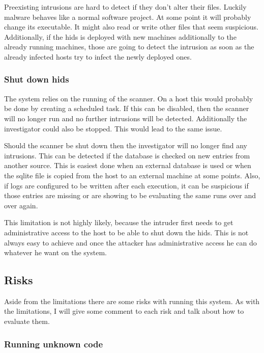 \documentclass[
	a4paper,					%
	10pt,							%
	twoside,					%
	openright,				%
	notitlepage,			%
	parskip=half,			%
]{scrreprt}					%
\begin{document}
Preexisting intrusions are hard to detect if they don't alter their files. Luckily malware behaves like a normal software project. At some point it will probably change its executable. It might also read or write other files that seem suspicious. Additionally, if the \gls{hids} is deployed with new machines additionally to the already running machines, those are going to detect the intrusion as soon as the already infected hosts try to infect the newly deployed ones.

\subsubsection{Shut down \gls{hids}}
\label{sec:limitation:noscan}
The system relies on the running of the scanner. On a host this would probably be done by creating a scheduled task. If this can be disabled, then the scanner will no longer run and no further intrusions will be detected. Additionally the investigator could also be stopped. This would lead to the same issue.

Should the scanner be shut down then the investigator will no longer find any intrusions. This can be detected if the database is checked on new entries from another source. This is easiest done when an external database is used or when the sqlite file is copied from the host to an external machine at some points. Also, if logs are configured to be written after each execution, it can be suspicious if those entries are missing or are showing to be evaluating the same runs over and over again. 

This limitation is not highly likely, because the intruder first needs to get administrative access to the host to be able to shut down the \gls{hids}. This is not always easy to achieve and once the attacker has administrative access he can do whatever he want on the system. 

\subsection{Risks}
\label{sec:risk}

Aside from the limitations there are some risks with running this system. As with the limitations, I will give some comment to each risk and talk about how to evaluate them.

\subsubsection{Running unknown code}
\label{sec:risk:unknowncode}
\end{document}
